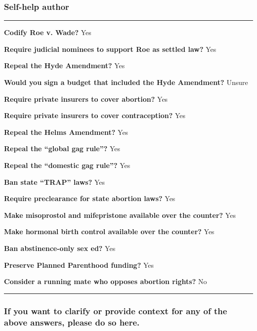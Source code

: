 \hypertarget{self-help-author}{%
\subsubsection{Self-help author}\label{self-help-author}}

\begin{center}\rule{0.5\linewidth}{\linethickness}\end{center}

\textbf{Codify Roe v. Wade?} Yes

\textbf{Require judicial nominees to support Roe as settled law?} Yes

\textbf{Repeal the Hyde Amendment?} Yes

\textbf{Would you sign a budget that included the Hyde Amendment?}
Unsure

\textbf{Require private insurers to cover abortion?} Yes

\textbf{Require private insurers to cover contraception?} Yes

\textbf{Repeal the Helms Amendment?} Yes

\textbf{Repeal the ``global gag rule''?} Yes

\textbf{Repeal the ``domestic gag rule''?} Yes

\textbf{Ban state ``TRAP'' laws?} Yes

\textbf{Require preclearance for state abortion laws?} Yes

\textbf{Make misoprostol and mifepristone available over the counter?}
Yes

\textbf{Make hormonal birth control available over the counter?} Yes

\textbf{Ban abstinence-only sex ed?} Yes

\textbf{Preserve Planned Parenthood funding?} Yes

\textbf{Consider a running mate who opposes abortion rights?} No

\begin{center}\rule{0.5\linewidth}{\linethickness}\end{center}

\hypertarget{if-you-want-to-clarify-or-provide-context-for-any-of-the-above-answers-please-do-so-here-8}{%
\subsubsection{If you want to clarify or provide context for any of the
above answers, please do so
here.}\label{if-you-want-to-clarify-or-provide-context-for-any-of-the-above-answers-please-do-so-here-8}}

